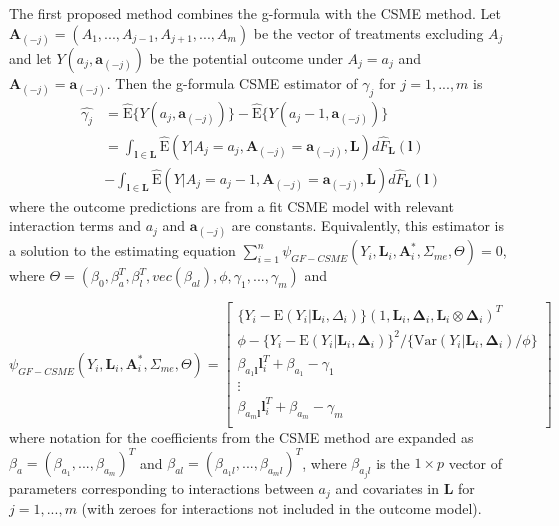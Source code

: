 \documentclass[useAMS,usenatbib,referee]{biom}
\begin{document}
\sloppy The first proposed method combines the g-formula with the CSME method. Let $\bm{A}_{(-j)} = (A_{1}, ..., A_{j-1}, A_{j+1}, ..., A_{m})$ be the vector of treatments excluding $A_{j}$ and let $Y(a_{j}, \bm{a}_{(-j)})$ be the potential outcome under $A_{j} = a_{j}$ and $\bm{A}_{(-j)} = \bm{a}_{(-j)}$. Then the g-formula CSME estimator of $\gamma_{j}$ for $j = 1,...,m$ is
\begin{align*}
    \hat{\gamma_{j}} &= \hat{\text{E}}\{ Y(a_{j}, \bm{a}_{(-j)}) \} - \hat{\text{E}}\{ Y(a_{j} - 1, \bm{a}_{(-j)}) \} \\
    &= \int_{\bm{l} \in \bm{L}} \hat{\text{E}}(Y | A_{j} = a_{j}, \bm{A}_{(-j)} = \bm{a}_{(-j)}, \bm{L}) d\hat{F}_{\bm{L}}(\bm{l}) \\
    &- \int_{\bm{l} \in \bm{L}} \hat{\text{E}}(Y | A_{j} = a_{j} - 1, \bm{A}_{(-j)} = \bm{a}_{(-j)}, \bm{L}) d\hat{F}_{\bm{L}}(\bm{l})
\end{align*}
where the outcome predictions are from a fit CSME model with relevant interaction terms and $a_{j}$ and $\bm{a}_{(-j)}$ are constants. Equivalently, this estimator is a solution to the estimating equation $\sum_{i=1}^{n} \psi_{GF-CSME}(Y_{i}, \bm{L}_{i}, \bm{A}_{i}^{*}, \Sigma_{me}, \Theta) = 0$, where $\Theta = (\beta_{0}, \beta^{T}_{a}, \beta^{T}_{l}, vec(\beta_{al}), \phi, \gamma_{1}, ..., \gamma_{m})$ and

\begin{equation}
    \psi_{GF-CSME}(Y_{i}, \bm{L}_{i}, \bm{A}^{*}_{i}, \Sigma_{me}, \Theta) =
    \begin{bmatrix}
       \{ Y_{i} - \text{E}(Y_{i} | \bm{L}_{i}, \Delta_{i}) \} (1, \bm{L}_{i}, \bm{\Delta}_{i}, \bm{L}_{i} \otimes \bm{\Delta}_{i})^{T} \\
        \phi - \{ Y_{i} - \text{E}(Y_{i} | \bm{L}_{i}, \bm{\Delta}_{i}) \}^{2} / \{ \text{Var}(Y_{i} | \bm{L}_{i}, \bm{\Delta}_{i}) / \phi \} \\
        \beta_{a_{1}\bm{l}}\bm{l}_{i}^{T} + \beta_{a_{1}} - \gamma_{1} \\
        \vdots \\
        \beta_{a_{m}\bm{l}}\bm{l}_{i}^{T} + \beta_{a_{m}} - \gamma_{m} \\
    \end{bmatrix}
\end{equation}
where notation for the coefficients from the CSME method are expanded as $\beta_{a} = (\beta_{a_{1}},...,\beta_{a_{m}})^{T}$ and $\beta_{al} = (\beta_{a_{1}l}, ..., \beta_{a_{m}l})^{T}$, where $\beta_{a_{j}l}$ is the $1 \times p$ vector of parameters corresponding to interactions between $a_{j}$ and covariates in $\textbf{L}$ for $j = 1,...,m$ (with zeroes for interactions not included in the outcome model).
\end{document}
